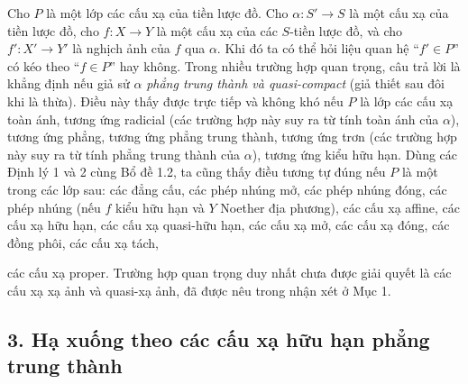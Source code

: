 \documentclass[11pt,twoside,openany]{book}
\numberwithin{equation}{section}
\newcommand{\src}[1]{%
  \phantomsection\hypertarget{src:\fgasourceid:#1}{}%
  \marginpar{\raggedleft\footnotesize\sffamily #1}%
}
\newcommand{\fgasourceid}{unset}
\begin{document}
Cho $P$ là một lớp các cấu xạ của tiền lược đồ. Cho
$\alpha:S'\longrightarrow S$ là một cấu xạ của tiền lược đồ, cho
$f:X\longrightarrow Y$ là một cấu xạ của các $S$-tiền lược đồ, và cho
$f':X'\longrightarrow Y'$ là nghịch ảnh của $f$ qua $\alpha$. Khi đó ta có thể
hỏi liệu quan hệ ``$f'\in P$'' có kéo theo ``$f\in P$'' hay không. Trong nhiều
trường hợp quan trọng, câu trả lời là khẳng định nếu giả sử $\alpha$
\emph{phẳng trung thành và quasi-compact} (giả thiết sau đôi khi là thừa). Điều
này thấy được trực tiếp và không khó nếu $P$ là lớp các cấu xạ toàn ánh, tương
ứng radicial (các trường hợp này suy ra từ tính toàn ánh của $\alpha$), tương
ứng phẳng, tương ứng phẳng trung thành, tương ứng trơn (các trường hợp này suy
ra từ tính phẳng trung thành của $\alpha$), tương ứng kiểu hữu hạn. Dùng các
Định lý 1 và 2 cùng Bổ đề 1.2, ta cũng thấy điều tương tự đúng nếu $P$ là một
trong các lớp sau: các đẳng cấu, các phép nhúng mở, các phép nhúng đóng, các
phép nhúng (nếu $f$ kiểu hữu hạn và $Y$ Noether địa phương), các cấu xạ affine,
các cấu xạ hữu hạn, các cấu xạ quasi-hữu hạn, các cấu xạ mở, các cấu xạ đóng,
các đồng phôi, các cấu xạ tách,

\src{319}
các cấu xạ proper. Trường hợp quan trọng duy nhất chưa được giải quyết là các
cấu xạ xạ ảnh và quasi-xạ ảnh, đã được nêu trong nhận xét ở Mục 1.

\subsection*{3. Hạ xuống theo các cấu xạ hữu hạn phẳng trung thành}
\end{document}
